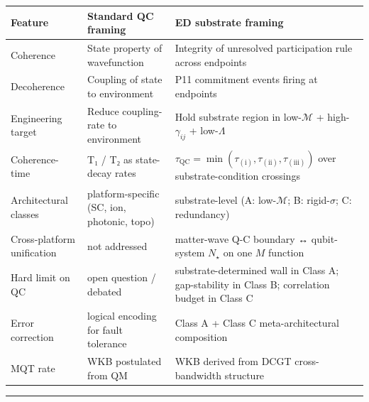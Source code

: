 \documentclass[
  11pt,
  a4paper,
]{article}
\newcounter{none} %
\begin{document}
{\def\LTcaptype{none} %
\begin{longtable}[]{@{}
  >{\raggedright\arraybackslash}p{}
  >{\raggedright\arraybackslash}p{}
  >{\raggedright\arraybackslash}p{}@{}}
\toprule\noalign{}
\begin{minipage}[b]{\linewidth}\raggedright
Feature
\end{minipage} & \begin{minipage}[b]{\linewidth}\raggedright
Standard QC framing
\end{minipage} & \begin{minipage}[b]{\linewidth}\raggedright
ED substrate framing
\end{minipage} \\
\midrule\noalign{}
\endhead
\bottomrule\noalign{}
\endlastfoot
Coherence & State property of wavefunction & Integrity of unresolved
participation rule across endpoints \\
Decoherence & Coupling of state to environment & P11 commitment events
firing at endpoints \\
Engineering target & Reduce coupling-rate to environment & Hold
substrate region in low-\(\mathcal{M}\) + high-\(\gamma_{ij}\) +
low-\(\Lambda\) \\
Coherence-time & T₁ / T₂ as state-decay rates &
\(\tau_{\mathrm{QC}} = \min(\tau_{(\mathrm{i})}, \tau_{(\mathrm{ii})}, \tau_{(\mathrm{iii})})\)
over substrate-condition crossings \\
Architectural classes & platform-specific (SC, ion, photonic, topo) &
substrate-level (A: low-\(\mathcal{M}\); B: rigid-\(\sigma\); C:
redundancy) \\
Cross-platform unification & not addressed & matter-wave Q-C boundary ↔
qubit-system \(N_\star\) on one \(M\) function \\
Hard limit on QC & open question / debated & substrate-determined wall
in Class A; gap-stability in Class B; correlation budget in Class C \\
Error correction & logical encoding for fault tolerance & Class A +
Class C meta-architectural composition \\
MQT rate & WKB postulated from QM & WKB derived from DCGT
cross-bandwidth structure \\
\end{longtable}
}

\begin{center}\rule{0.5\linewidth}{0.5pt}\end{center}
\end{document}
